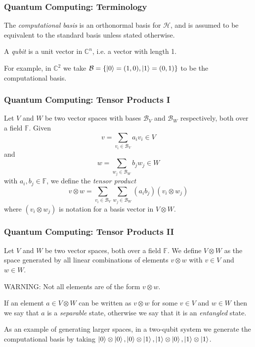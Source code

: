 \documentclass{beamer}
\renewcommand{\ket}{\Ket}
\renewcommand{\ket}{\Ket}
\newcommand{\tensor}{\otimes}
\newcommand{\bb}[1]{\mathbb{#1}}
\renewcommand{\cal}[1]{\mathcal{#1}}
\begin{document}
\begin{frame}
\frametitle{Quantum Computing: Terminology}\label{history:quantum_computing}
        \begin{definition}\label{def:computational_basis}
            The \textit{computational basis} is an orthonormal basis for $\cal{H}$, and is assumed to be equivalent to the standard basis unless stated otherwise.
        \end{definition}

        \begin{definition}[Qubit]\label{def:qubit}
            A \textit{qubit} is a unit vector in $\bb{C}^n$, i.e. a vector with length 1.
        \end{definition}
        
        For example, in $\bb{C}^2$ we take $\cal{B} = \{\ket{0} = (1,0), \ket{1} = (0, 1)\}$ to be the computational basis.
\end{frame}

\begin{frame}
\frametitle{Quantum Computing: Tensor Products I}
        \begin{definition}\label{def:tensor_product_of_vectors}
            Let $V$ and $W$ be two vector spaces with bases $\cal{B}_V$ and $\cal{B}_W$ respectively, both over a field $\bb{F}$.
            Given 
                $$v = \sum_{v_i \in \cal{B}_V} a_i v_i \in V$$ 
            and 
                $$w = \sum_{w_j \in \cal{B}_W} b_j w_j \in W$$
            with $a_i, b_j \in \bb{F}$, we define the \textit{tensor product} 
                $$v \otimes w = \sum_{v_i \in \cal{B}_V} \sum_{w_j \in \cal{B}_W} (a_i b_j) (v_i \otimes w_j)$$
            where $(v_i \otimes w_j)$ is notation for a basis vector in $V \otimes W$.
        \end{definition}
\end{frame}

\begin{frame}
\frametitle{Quantum Computing: Tensor Products II}
        \begin{definition}\label{def:tensor_product_of_vector_spaces}
            Let $V$ and $W$ be two vector spaces, both over a field $\bb{F}$.
            We define $V \otimes W$ as the space generated by all linear combinations of elements $v \otimes w$ with $v \in V$ and $w \in W$.
        \end{definition}
        WARNING: Not all elements are of the form $v \otimes w$.
        \begin{definition}\label{def:separable_and_entangled_states}
            If an element $a \in V \otimes W$ can be written as $v \otimes w$ for some $v \in V$ and $w \in W$ then we say that $a$ is a \textit{separable} state, otherwise we say that it is an \textit{entangled} state.
        \end{definition}
        As an example of generating larger spaces, in a two-qubit system we generate the computational basis by taking $\ket{0} \tensor \ket{0}, \ket{0} \tensor \ket{1}, \ket{1} \tensor \ket{0}, \ket{1} \tensor \ket 1$.
\end{frame}
\end{document}
